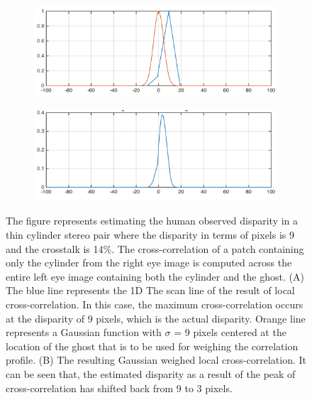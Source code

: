 \begin{figure}[htbp]
    \centering
    \begin{subfigure}[b]{0.9\textwidth}
        \includegraphics[width=\textwidth]{./Template_Figures/normal_ccr}
        \caption{}\label{fig:normal_ccr}
    \end{subfigure}

    \begin{subfigure}[b]{0.9\textwidth}
        \includegraphics[width=\textwidth]{./Template_Figures/windowed_ccr}
        \caption{}\label{fig:windowed_ccr}
    \end{subfigure}

    \caption{The figure represents estimating the human observed disparity in a thin cylinder stereo pair where the disparity in terms of pixels is 9 and the crosstalk is 14\%. The cross-correlation of a patch containing only the cylinder from the right eye image is computed across the entire left eye image containing both the cylinder and the ghost. (A) The blue line represents the 1D The scan line of the result of local cross-correlation. In this case, the maximum cross-correlation occurs at the disparity of 9 pixels, which is the actual disparity. Orange line represents a Gaussian function with $\sigma$ = 9 pixels centered at the location of the ghost that is to be used for weighing the correlation profile. (B) The resulting Gaussian weighed local cross-correlation. It can be seen that, the estimated disparity as a result of the peak of cross-correlation has shifted back from 9 to 3 pixels.\label{fig:windowed_ccr_f}}
\end{figure}


